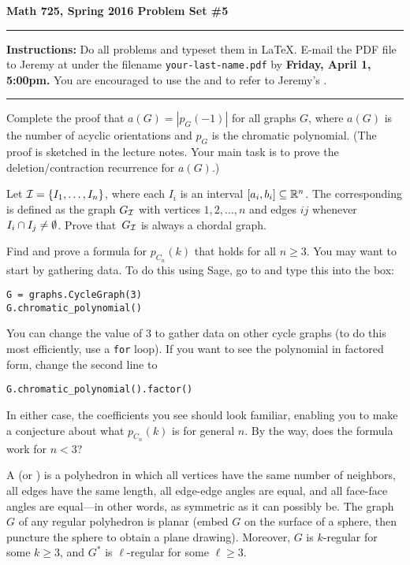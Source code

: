 

\thispagestyle{empty}
{\bf Math 725, Spring 2016 \hfill Problem Set \#5}
\smallskip\hrule

{\bf Instructions:} Do all problems and typeset them in \LaTeX.  E-mail the PDF file to Jeremy at  under the filename {\tt your-last-name.pdf} by {\bf Friday, April 1, 5:00pm.}
You are encouraged to use the  and to refer to Jeremy's .

\smallskip\hrule

\prob Complete the proof that $a(G)=|p_G(-1)|$ for all graphs $G$, where $a(G)$ is the number of acyclic orientations and $p_G$ is the chromatic polynomial.  (The proof is sketched in the lecture notes.  Your main task is to prove the deletion/contraction recurrence for $a(G)$.)

\prob Let $\mathcal{I}=\{I_1,\dots,I_n\}$, where each $I_i$ is an interval $[a_i,b_i]\subseteq{\mathbb R}^n$.  The corresponding  is defined as the graph $G_{\mathcal{I}}$ with vertices $1,2,\dots,n$ and edges $ij$ whenever $I_i\cap I_j\neq\emptyset$.  Prove that~$G_{\mathcal{I}}$ is always a chordal graph.

\prob
Find and prove a formula for $p_{C_n}(k)$ that holds for all $n\geq 3$.   You may want to start by gathering data.  To do this using Sage, go to  and type this into the box:
\begin{verbatim}
G = graphs.CycleGraph(3)
G.chromatic_polynomial()
\end{verbatim}
You can change the value of 3 to gather data on other cycle graphs (to do this most efficiently, use a \verb+for+ loop).  If you want to see the polynomial in factored form, change the second line to
\begin{verbatim}
G.chromatic_polynomial().factor()
\end{verbatim}
In either case, the coefficients you see should look familiar, enabling you to make a conjecture about what $p_{C_n}(k)$ is for general $n$.  By the way, does the formula work for $n<3$?

\prob A  (or ) is a polyhedron in which all vertices have the same number of neighbors, all edges have the same length, all edge-edge angles are equal, and all face-face angles are equal---in other words, as symmetric as it can possibly be.  The graph $G$ of any regular polyhedron is planar (embed $G$ on the surface of a sphere, then puncture the sphere to obtain a plane drawing).  Moreover, $G$ is $k$-regular for some $k\geq 3$, and $G^*$ is $\ell$-regular for some $\ell \geq 3$.

